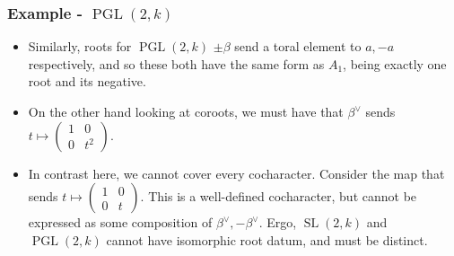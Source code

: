 \documentclass{beamer}
\theoremstyle{remark}
\begin{document}
\begin{frame}
\frametitle{Example - $\operatorname{PGL}(2,k)$}
\begin{itemize}
\item Similarly, roots for $\operatorname{PGL}(2,k)$ $\pm \beta$ send a toral element to $a, -a$ respectively, and so these both have the same form as $A_1$, being exactly one root and its negative.
\pause
\item On the other hand looking at coroots, we must have that $\beta^\vee$ sends $t \mapsto \begin{pmatrix} 1 & 0 \\ 0 & t^{2} \end{pmatrix}$.
\pause
\item In contrast here, we cannot cover every cocharacter. Consider the map that sends $t \mapsto \begin{pmatrix} 1 & 0 \\ 0 & t \end{pmatrix}$. This is a well-defined cocharacter, but cannot be expressed as some composition of $\beta^\vee, -\beta^\vee$. Ergo, $\operatorname{SL}(2,k)$ and $\operatorname{PGL}(2,k)$ cannot have isomorphic root datum, and must be distinct.
\end{itemize}
\end{frame}
\end{document}
